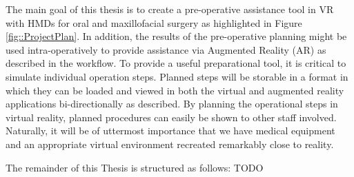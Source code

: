 The main goal of this thesis is to create a pre-operative assistance tool in VR with HMDs for oral and maxillofacial surgery as highlighted in Figure \ref{fig::ProjectPlan}. 
In addition, the results of the pre-operative planning might be used intra-operatively to provide assistance via Augmented Reality (AR) as described in the workflow.
To provide a useful preparational tool, it is critical to simulate individual operation steps.
Planned steps will be storable in a format in which they can be loaded and viewed in both the virtual and augmented reality applications bi-directionally as described.
By planning the operational steps in virtual reality, planned procedures can easily be shown to other staff involved.
Naturally, it will be of uttermost importance that we have medical equipment and an appropriate virtual environment recreated remarkably close to reality.

The remainder of this Thesis is structured as follows: TODO